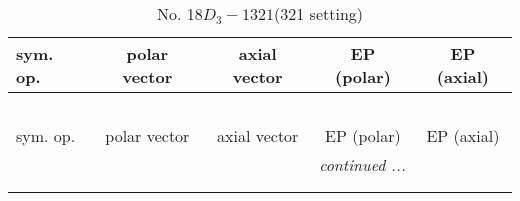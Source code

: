 \documentclass[fleqn,10pt,landscape]{jsarticle}
\begin{document}
\newpage
\begin{center}
\renewcommand{\arraystretch}{1.3}
\begin{longtable}{lcccc}
\caption{No. 18\quad$D_{3}-1$\quad$321$\quad(321 setting)\quad[ trigonal ]}
 \\
 \hline \hline
sym. op. & polar vector & axial vector & EP (polar) & EP (axial) \\ \hline \endfirsthead

\multicolumn{4}{l}{\tablename\ \thetable{}} \\
 \hline \hline
sym. op. & polar vector & axial vector & EP (polar) & EP (axial) \\ \hline \endhead

 \hline \hline
\multicolumn{4}{r}{\footnotesize\it continued ...} \\ \endfoot

 \hline \hline
\multicolumn{4}{r}{} \\ \endlastfoot


\end{longtable}
\end{center}
\end{document}
